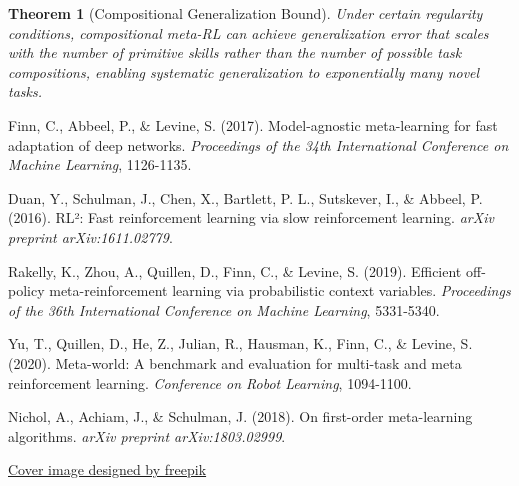 \documentclass[12pt]{article}
\newtheorem{theorem}{Theorem}
\begin{document}
{{			\begin{theorem}[Compositional Generalization Bound]
			Under certain regularity conditions, compositional meta-RL can achieve generalization error that scales with the number of primitive skills rather than the number of possible task compositions, enabling systematic generalization to exponentially many novel tasks.
			\end{theorem}
			
			\begin{thebibliography}{9}
				
				Finn, C., Abbeel, P., \& Levine, S. (2017). Model-agnostic meta-learning for fast adaptation of deep networks. \textit{Proceedings of the 34th International Conference on Machine Learning}, 1126-1135.
				
				Duan, Y., Schulman, J., Chen, X., Bartlett, P. L., Sutskever, I., \& Abbeel, P. (2016). RL²: Fast reinforcement learning via slow reinforcement learning. \textit{arXiv preprint arXiv:1611.02779}.
				
				Rakelly, K., Zhou, A., Quillen, D., Finn, C., \& Levine, S. (2019). Efficient off-policy meta-reinforcement learning via probabilistic context variables. \textit{Proceedings of the 36th International Conference on Machine Learning}, 5331-5340.
				
				Yu, T., Quillen, D., He, Z., Julian, R., Hausman, K., Finn, C., \& Levine, S. (2020). Meta-world: A benchmark and evaluation for multi-task and meta reinforcement learning. \textit{Conference on Robot Learning}, 1094-1100.
				
				Nichol, A., Achiam, J., \& Schulman, J. (2018). On first-order meta-learning algorithms. \textit{arXiv preprint arXiv:1803.02999}.
				
				\href{https://www.freepik.com/free-vector/cute-artificial-intelligence-robot-isometric-icon_16717130.htm}{Cover image designed by freepik}
				
			\end{thebibliography}
			
	}}
	
	
\end{document}
